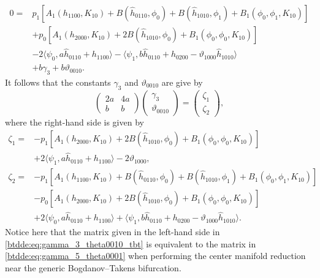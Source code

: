 \begin{align*}
0 ={}& p_1 \left[A_1(h_{1100},K_{10}) + B(\hat h_{0110},\phi_0) + B(\hat h_{1010},\phi_1) + B_1(\phi_0,\phi_1,K_{10})\right] \\
     & + p_0 \left[A_1(h_{2000},K_{10})+ 2 B(\hat h_{1010},\phi_0) + B_1(\phi_0,\phi_0,K_{10})\right] \\
     & -2\langle\psi_0, a \hat h_{0110} + h_{1100}\rangle -\langle\psi_1, b \hat h_{0110} + h_{0200} - \vartheta_{1000} \hat h_{1010}\rangle \\
     & + b \gamma_3 + b\vartheta_{0010}.
\end{align*}
It follows that the constants $\gamma_3$ and $\vartheta_{0010}$ are give by
\begin{equation}
\label{btdde:eq:gamma_3_theta0010_tbt}
\begin{pmatrix}
				 2a &  4a \\
				  b &   b 
\end{pmatrix}
\begin{pmatrix}
				\gamma_3 \\
				\vartheta_{0010}
\end{pmatrix}
=
\begin{pmatrix}
				\zeta_1 \\
				\zeta_2 
\end{pmatrix},
\end{equation}
where the right-hand side is given by
\begin{equation}
\label{btdde:eq:zeta1_zeta2_tbt}
\begin{aligned}
\zeta_1 ={}& -p_1\left[A_1(h_{2000},K_{10})+ 2 B(\hat h_{1010},\phi_0) + B_1(\phi_0,\phi_0,K_{10})\right] \\
           & +2\langle\psi_1,a \hat h_{0110} + h_{1100}\rangle - 2\vartheta_{1000}, \\
\zeta_2 ={}& -p_1 \left[A_1(h_{1100},K_{10}) + B(\hat h_{0110},\phi_0) + B(\hat h_{1010},\phi_1) + B_1(\phi_0,\phi_1,K_{10})\right] \\
           & - p_0 \left[A_1(h_{2000},K_{10})+ 2 B(\hat h_{1010},\phi_0) + B_1(\phi_0,\phi_0,K_{10})\right] \\
           & +2\langle\psi_0, a \hat h_{0110} + h_{1100}\rangle +\langle\psi_1, b \hat h_{0110} + h_{0200} - \vartheta_{1000} \hat h_{1010}\rangle.
\end{aligned}
\end{equation}
Notice here that the matrix given in the left-hand side in
\cref{btdde:eq:gamma_3_theta0010_tbt} is equivalent to the matrix in
\cref{btdde:eq:gamma_5_theta0001} when performing the center manifold reduction near
the generic Bogdanov--Takens bifurcation. 


